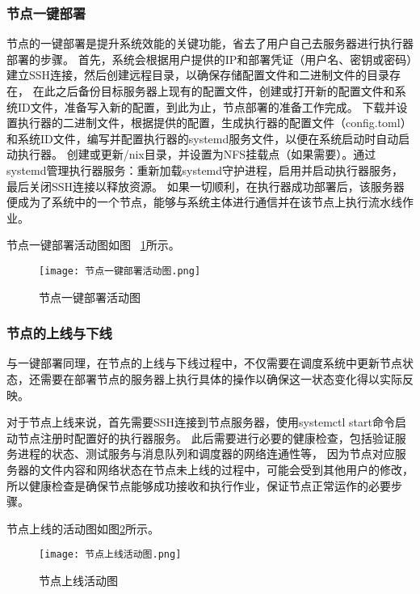 \subsubsection{节点一键部署}

节点的一键部署是提升系统效能的关键功能，省去了用户自己去服务器进行执行器部署的步骤。
首先，系统会根据用户提供的IP和部署凭证（用户名、密钥或密码）建立SSH连接，然后创建远程目录，以确保存储配置文件和二进制文件的目录存在，
在此之后备份目标服务器上现有的配置文件，创建或打开新的配置文件和系统ID文件，准备写入新的配置，到此为止，节点部署的准备工作完成。
下载并设置执行器的二进制文件，根据提供的配置，生成执行器的配置文件（config.toml）和系统ID文件，编写并配置执行器的systemd服务文件，以便在系统启动时自动启动执行器。
创建或更新/nix目录，并设置为NFS挂载点（如果需要）。通过systemd管理执行器服务：重新加载systemd守护进程，启用并启动执行器服务，最后关闭SSH连接以释放资源。
如果一切顺利，在执行器成功部署后，该服务器便成为了系统中的一个节点，能够与系统主体进行通信并在该节点上执行流水线作业。

节点一键部署活动图如图~ \ref{fig:节点一键部署活动图}所示。

\begin{figure}[h]
  \centering
  \texttt{[image: 节点一键部署活动图.png]}
  \caption{节点一键部署活动图}
  \label{fig:节点一键部署活动图}
\end{figure}

\subsubsection{节点的上线与下线}
与一键部署同理，在节点的上线与下线过程中，不仅需要在调度系统中更新节点状态，还需要在部署节点的服务器上执行具体的操作以确保这一状态变化得以实际反映。

对于节点上线来说，首先需要SSH连接到节点服务器，使用systemctl start命令启动节点注册时配置好的执行器服务。
此后需要进行必要的健康检查，包括验证服务进程的状态、测试服务与消息队列和调度器的网络连通性等，
因为节点对应服务器的文件内容和网络状态在节点未上线的过程中，可能会受到其他用户的修改，所以健康检查是确保节点能够成功接收和执行作业，保证节点正常运作的必要步骤。

节点上线的活动图如图\ref{fig:节点上线活动图}所示。

\begin{figure}[h]
  \centering
  \texttt{[image: 节点上线活动图.png]}
  \caption{节点上线活动图}
  \label{fig:节点上线活动图}
\end{figure}

